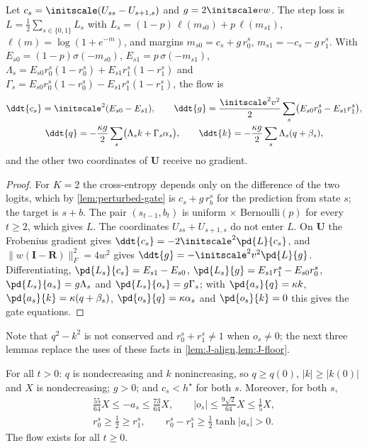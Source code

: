 \begin{lemma}[Reduced flow for $K=2$]
\label{lem:perturbed-reduce}
Let $c_s=\initscale(U_{ss}-U_{s+1,s})$ and $g=2\initscale vw$. The step loss is
$L=\frac12\sum_{s\in\{0,1\}}L_s$ with $L_s=(1-p)\,\ell(m_{s0})+p\,\ell(m_{s1})$, $\ell(m)=\log(1+e^{-m})$, and margins
$m_{s0}=c_s+g\,r^s_0$, $m_{s1}=-c_s-g\,r^s_1$. With $E_{s0}=(1-p)\sigma(-m_{s0})$, $E_{s1}=p\,\sigma(-m_{s1})$,
$\Lambda_s=E_{s0}r^s_0(1-r^s_0)+E_{s1}r^s_1(1-r^s_1)$ and $\Gamma_s=E_{s0}r^s_0(1-r^s_0)-E_{s1}r^s_1(1-r^s_1)$, the flow is
\begin{gather*}
 \ddt{c_s}=\initscale^2(E_{s0}-E_{s1}),\qquad \ddt{g}=\frac{\initscale^2v^2}{2}\sum_s\bigl(E_{s0}r^s_0-E_{s1}r^s_1\bigr),\\
 \ddt{q}=-\frac{\kappa g}{2}\sum_s\bigl(\Lambda_sk+\Gamma_s\alpha_s\bigr),\qquad \ddt{k}=-\frac{\kappa g}{2}\sum_s\Lambda_s(q+\beta_s),
\end{gather*}
and the other two coordinates of $\mathbf U$ receive no gradient.
\end{lemma}

\begin{proof}
For $K=2$ the cross-entropy depends only on the difference of the two logits, which by \cref{lem:perturbed-gate} is $c_s+g\,r^s_b$ for the
prediction from state $s$; the target is $s+b$. The pair $(s_{t-1},b_t)$ is uniform $\times$ Bernoulli$(p)$ for every $t\ge2$, which gives $L$.
The coordinates $U_{ss}+U_{s+1,s}$ do not enter $L$. On $\mathbf U$ the Frobenius gradient gives $\ddt{c_s}=-2\initscale^2\pd{L}{c_s}$, and
$\|w(\mathbf I-\mathbf R)\|_F^2=4w^2$ gives $\ddt{g}=-\initscale^2v^2\pd{L}{g}$. Differentiating, $\pd{L_s}{c_s}=E_{s1}-E_{s0}$,
$\pd{L_s}{g}=E_{s1}r^s_1-E_{s0}r^s_0$, $\pd{L_s}{a_s}=g\Lambda_s$ and $\pd{L_s}{o_s}=g\Gamma_s$; with $\pd{a_s}{q}=\kappa k$, $\pd{a_s}{k}=\kappa(q+\beta_s)$,
$\pd{o_s}{q}=\kappa\alpha_s$ and $\pd{o_s}{k}=0$ this gives the gate equations.
\end{proof}

Note that $q^2-k^2$ is not conserved and $r^s_0+r^s_1\ne1$ when $o_s\ne0$; the next three lemmas replace the uses of these facts in
\cref{lem:J-align,lem:J-floor}.

\begin{lemma}
\label{lem:perturbed-invariant}
For all $t>0$: $q$ is nondecreasing and $k$ nonincreasing, so $q\ge q(0)$, $|k|\ge|k(0)|$ and $X$ is nondecreasing; $g>0$; and $c_s<h^\star$
for both $s$. Moreover, for both $s$,
\begin{equation}
 \begin{gathered}
 \tfrac{55}{64}X\le-a_s\le\tfrac{73}{64}X,\qquad |o_s|\le\tfrac{9\sqrt2}{64}X\le\tfrac15X,\\
 r^s_0\ge\tfrac12\ge r^s_1,\qquad r^s_0-r^s_1\ge\tfrac12\tanh|a_s|>0.
 \end{gathered}
 \label{eq:perturbed-gate-bounds}
\end{equation}
The flow exists for all $t\ge0$.
\end{lemma}


